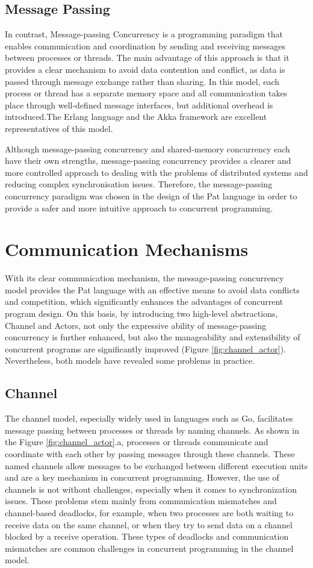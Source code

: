 \documentclass{l4proj}
\begin{document}
\subsection{Message Passing}
In contrast, Message-passing Concurrency is a programming paradigm that enables communication and coordination by sending and receiving messages between processes or threads. The main advantage of this approach is that it provides a clear mechanism to avoid data contention and conflict, as data is passed through message exchange rather than sharing. In this model, each process or thread has a separate memory space and all communication takes place through well-defined message interfaces, but additional overhead is introduced.The Erlang language and the Akka framework are excellent representatives of this model.

Although message-passing concurrency and shared-memory concurrency each have their own strengths, message-passing concurrency provides a clearer and more controlled approach to dealing with the problems of distributed systems and reducing complex synchronisation issues. Therefore, the message-passing concurrency paradigm was chosen in the design of the Pat language in order to provide a safer and more intuitive approach to concurrent programming.

\section{Communication Mechanisms}
With its clear communication mechanism, the message-passing concurrency model provides the Pat language with an effective means to avoid data conflicts and competition, which significantly enhances the advantages of concurrent program design. On this basis, by introducing two high-level abstractions, Channel and Actors, not only the expressive ability of message-passing concurrency is further enhanced, but also the manageability and extensibility of concurrent programs are significantly improved (Figure \ref{fig:channel_actor}). Nevertheless, both models have revealed some problems in practice.

\subsection{Channel}
The channel model, especially widely used in languages such as Go, facilitates message passing between processes or threads by naming channels. As shown in the Figure \ref{fig:channel_actor}.a, processes or threads communicate and coordinate with each other by passing messages through these channels. These named channels allow messages to be exchanged between different execution units and are a key mechanism in concurrent programming. However, the use of channels is not without challenges, especially when it comes to synchronization issues. These problems stem mainly from communication mismatches and channel-based deadlocks, for example, when two processes are both waiting to receive data on the same channel, or when they try to send data on a channel blocked by a receive operation. These types of deadlocks and communication mismatches are common challenges in concurrent programming in the channel model.
\end{document}
